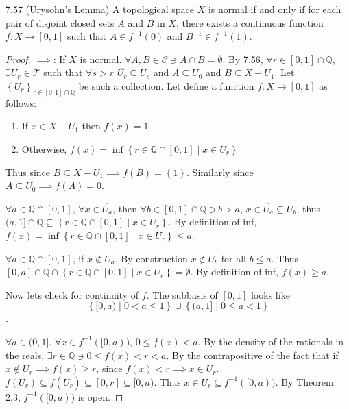 \documentclass{article}
\newcommand*{\T}{\mathcal{T}}
\newcommand*{\subeq}{\subseteq}
\newcommand*{\empset}{\emptyset}
\newcommand{\Q}{\mathbb{Q}}
\begin{document}
\bigskip

\begin{claim}{7.57}\label{Claim 7.57.}
    (Urysohn's Lemma) A topological space $X$ is normal if and only if for each pair of disjoint closed sets $A$  and $B$ in $X$, there exists a continuous function $f: X \to [0, 1]$ such that $A \in f^{-1}(0)$ and $B^{-1} \in f^{-1}(1)$.   
\end{claim}
\begin{proof}
    $\implies$: If $X$ is normal. $\forall A, B \in \mathcal{C} \ni A \cap B = \empset$.   By 7.56, $\forall r \in [0, 1] \cap \Q$, $\exists U_r \in \T $ such that $\forall s > r$ $\overline{U_r} \subeq U_s$ and $A \subeq U_0$ and $B \subeq X - U_1$. Let $\left\{ U_r \right\}_{r \in [0, 1] \cap \Q}$ be such a collection. Let define a function $f : X \to [0, 1]$ as follows: 
    
    \begin{enumerate}
        \item If $x \in X - U_1$ then $f(x) = 1$
        \item Otherwise, $f(x) = \inf\left\{ r \in \Q \cap [0, 1] \mid x \in U_r \right\}$     
    \end{enumerate}
    
    Thus since $B \subeq X - U_1 \implies f(B) = \left\{ 1 \right\}$. Similarly since $A \subeq U_0 \implies f(A) = 0$.

    $\forall a \in \Q \cap [0, 1]$, $\forall x \in \overline{U_a}$, then $\forall b \in [0, 1] \cap \Q \ni b > a$, $x \in \overline{U_a} \subeq U_b$, thus $(a, 1] \cap \Q \subeq \left\{ r \in \Q \cap [0, 1] \mid x \in U_r \right\}$. By definition of inf, $f(x) = \inf \left\{ r \in \Q \cap [0, 1] \mid x \in U_r \right\}\leq a$. 
    
    $\forall a \in \Q \cap [0, 1]$, if $x \not \in U_a$. By construction $x \not \in U_b$ for all $b \leq a$. Thus $[0, a] \cap \Q \cap \left\{ r \in \Q \cap [0, 1] \mid x \in U_r \right\} = \empset$. By definition of inf, $f(x) \geq a$.       
    
    Now lets check for continuity of $f$. The subbasis of $[0, 1]$ looks like \[
        \left\{ [0, a) \mid 0 < a \leq 1 \right\} \cup \left\{ (a, 1] \mid 0 \leq a < 1 \right\}
    \].   
    
    $\forall a \in (0, 1]$. $\forall x \in f^{-1}([0, a))$, $0 \leq f(x) < a$. By the density of the rationals in the reals, $ \exists r \in \Q \ni 0 \leq f(x) < r < a$. By the contrapositive of the fact that if $x \not \in U_r \implies f(x) \geq r$, since $f(x) < r \implies x \in U_r$. $f(U_r) \subeq f(\overline{U_r}) \subeq [0, r] \subeq [0, a)$. Thus $x \in U_r \subeq f^{-1}([0, a))$.  By Theorem 2.3, $f^{-1}([0, a))$ is open. 
    

\end{proof}
\end{document}
